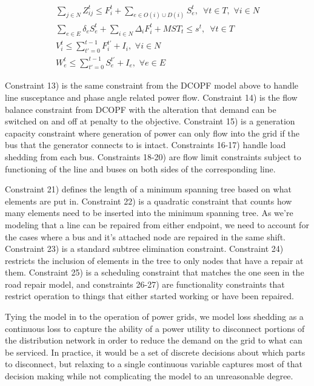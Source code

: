 \documentclass{article}
\begin{document}
\begin{eqnarray}
	\sum_{j \in N} Z_{ij}^t \leq F_i^t + \sum_{e \in O(i) \cup D(i)} S_{e}^t, \hspace{6pt} \forall t \in T, \hspace{4pt} \forall i \in N \\
	\sum_{e \in E} \delta_{e}S_e^t + \sum_{i \in N}\Delta_{i}F_i^t + MST_t \le s^t, \hspace{6pt} \forall t \in T\\
	V_i^t \leq \sum_{t'=0}^{t-1} F_i^{t'}+I_i, \hspace{4pt} \forall i \in N\\
	W_{e}^t \leq \sum_{t'=0}^{t-1} S_{e}^{t'}+I_e, \hspace{4pt} \forall e \in E
	\end{eqnarray}
	
	Constraint 13) is the same constraint from the DCOPF model above to handle line susceptance and phase angle related power flow. Constraint 14) is the flow balance constraint from DCOPF with the alteration that demand can be switched on and off at penalty to the objective. Constraint 15) is a generation capacity constraint where generation of power can only flow into the grid if the bus that the generator connects to is intact. Constraints 16-17) handle load shedding from each bus. Constraints 18-20) are flow limit constraints subject to functioning of the line and buses on both sides of the corresponding line.
	
	Constraint 21) defines the length of a minimum spanning tree based on what elements are put in. Constraint 22) is a quadratic constraint that counts how many elements need to be inserted into the minimum spanning tree. As we're modeling that a line can be repaired from either endpoint, we need to account for the cases where a bus and it's attached node are repaired in the same shift. Constraint 23) is a standard subtree elimination constraint. Constraint 24) restricts the inclusion of elements in the tree to only nodes that have a repair at them. Constraint 25) is a scheduling constraint that matches the one seen in the road repair model, and constraints 26-27) are functionality constraints that restrict operation to things that either started working or have been repaired.
	
	Tying the model in to the operation of power grids, we model loss shedding as a continuous loss to capture the ability of a power utility to disconnect portions of the distribution network in order to reduce the demand on the grid to what can be serviced. In practice, it would be a set of discrete decisions about which parts to disconnect, but relaxing to a single continuous variable captures most of that decision making while not complicating the model to an unreasonable degree.
	
\end{document}

